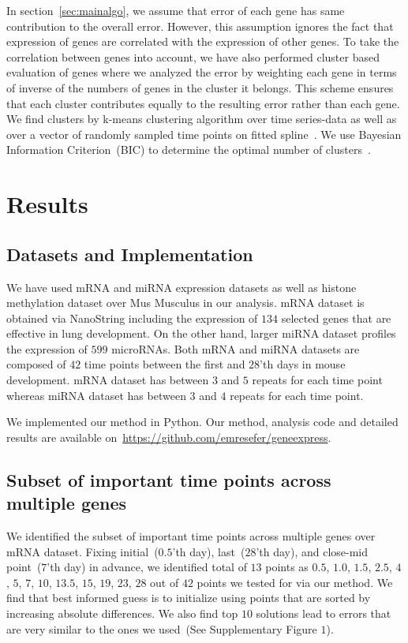 \documentclass[10pt]{article}
\begin{document}
In section~\ref{sec:mainalgo}, we assume that error of each gene has same contribution to the overall error. However, this assumption ignores the
fact that expression of genes are correlated with the expression of other genes. To take the
correlation between genes into account, we have also performed cluster
based evaluation of genes where we analyzed the error by weighting each gene in terms of inverse of the numbers of
genes in the cluster it belongs. This scheme ensures that each cluster
contributes equally to the resulting error rather than each gene. We find clusters by k-means
clustering algorithm over time series-data as well as over a vector of
randomly sampled time points on fitted spline~\cite{bishop2006}. We use Bayesian Information Criterion~(BIC) to
determine the optimal number of clusters~\cite{bic}.

\section{Results}

\subsection{Datasets and Implementation}

We have used mRNA and miRNA expression datasets as well as histone
methylation dataset over Mus Musculus in our analysis. mRNA dataset is obtained via
NanoString including the expression of $134$ selected genes that are
effective in lung development. On the other hand, larger miRNA dataset
profiles the expression of $599$ microRNAs. Both mRNA and
miRNA datasets are composed of $42$ time points between the first and
$28$'th days in mouse development. mRNA dataset has between $3$ and $5$ repeats for each time point whereas miRNA dataset has between $3$ and $4$ repeats for each time point.

We implemented our method in Python. Our method, analysis code and
detailed results are available on~\url{https://github.com/emresefer/geneexpress}.

\subsection{Subset of important time points across multiple genes}\label{sec:findsubset}

We identified the subset of important time points across multiple
genes over mRNA dataset. Fixing initial~($0.5$'th day), last~($28$'th
day), and close-mid point~($7$'th day) in advance, we identified total of $13$ points as $0.5$, $1.0$, $1.5$, $2.5$, $4$,
$5$, $7$, $10$, $13.5$, $15$, $19$, $23$, $28$ out of $42$ points we
tested for via our method. We find that best informed guess is to
initialize using points that are sorted by increasing absolute
differences. We also find top $10$ solutions lead to errors that are
very similar to the ones we used~(See Supplementary Figure $1$).
\end{document}

